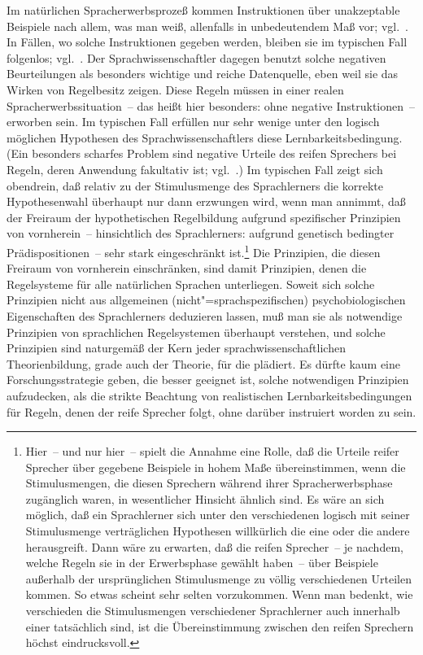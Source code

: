 \documentclass[output=paper]{langsci/langscibook}
\begin{document}
\addlines%
Im natürlichen Spracherwerbsprozeß kommen Instruktionen über unakzeptable Beispiele nach allem, was man weiß, allenfalls in unbedeutendem Maß vor; vgl.\
\citet[64f]{WexlerCulicover1980}. In Fällen, wo solche Instruktionen gegeben werden,
bleiben sie im typischen Fall folgenlos; vgl.\ \citet[160f]{Braine1971}. Der Sprachwissenschaftler dagegen benutzt solche negativen Beurteilungen als besonders wichtige
und reiche Datenquelle, eben weil sie das Wirken von Regelbesitz zeigen. Diese Regeln müssen in einer realen Spracherwerbssituation~-- das heißt hier besonders: ohne
negative Instruktionen~-- erworben sein. Im typischen Fall erfüllen nur sehr wenige
unter den logisch möglichen Hypothesen des Sprachwissenschaftlers diese Lernbarkeitsbedingung. (Ein besonders scharfes Problem sind negative Urteile des reifen
Sprechers bei Regeln, deren Anwendung fakultativ ist; vgl.\ \citet{Baker1979}.) Im typischen Fall zeigt sich obendrein, daß relativ zu der Stimulusmenge des Sprachlerners
die korrekte Hypothesenwahl überhaupt nur dann erzwungen wird, wenn man annimmt, daß der Freiraum der hypothetischen Regelbildung aufgrund spezifischer
Prinzipien von vornherein~-- \dash hinsichtlich des Sprachlerners: aufgrund genetisch
bedingter Prädispositionen~-- sehr stark eingeschränkt ist.\footnote{%
  Hier~-- und nur hier~-- spielt die Annahme eine Rolle, daß die Urteile reifer Sprecher über
  gegebene Beispiele in hohem Maße übereinstimmen, wenn die Stimulusmengen, die diesen Sprechern
  während ihrer Spracherwerbsphase zugänglich waren, in wesentlicher Hinsicht ähnlich sind. Es wäre
  an sich möglich, daß ein Sprachlerner sich unter den verschiedenen logisch mit seiner
  Stimulusmenge verträglichen Hypothesen willkürlich die eine oder die andere herausgreift. Dann
  wäre zu erwarten, daß die reifen Sprecher~-- je nachdem, welche Regeln sie in der Erwerbsphase
  gewählt haben~– über Beispiele außerhalb der ursprünglichen Stimulusmenge zu völlig verschiedenen
  Urteilen kommen. So etwas scheint sehr selten vorzukommen. Wenn man bedenkt, wie verschieden die
  Stimulusmengen verschiedener Sprachlerner auch innerhalb einer \textsq{Sprachgemeinschaft}
  tatsächlich sind, ist die Übereinstimmung zwischen den reifen Sprechern höchst eindrucksvoll.%
}
Die Prinzipien, die diesen Freiraum von vornherein einschränken, sind damit Prinzipien, denen die Regelsysteme für alle natürlichen Sprachen unterliegen. Soweit sich solche Prinzipien
nicht aus allgemeinen (nicht"=sprachspezifischen) psychobiologischen Eigenschaften
des Sprachlerners deduzieren lassen, muß man sie als notwendige Prinzipien von
sprachlichen Regelsystemen überhaupt verstehen, und solche Prinzipien sind naturgemäß der Kern jeder sprachwissenschaftlichen Theorienbildung, grade auch der
\textsq{platonistischen} Theorie, für die \citet{Katz1981} plädiert. Es dürfte kaum eine Forschungsstrategie geben, die besser geeignet ist, solche notwendigen Prinzipien aufzudecken, als die strikte Beachtung von realistischen Lernbarkeitsbedingungen für
Regeln, denen der reife Sprecher folgt, ohne darüber instruiert worden zu sein.
\end{document}
